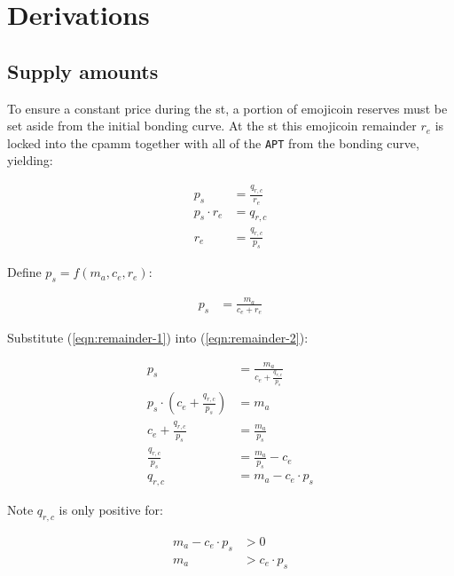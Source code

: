 \documentclass[table, twocolumn]{article}
\begin{document}
\section{Derivations} \label{sec:derivations}

\subsection{Supply amounts} \label{sec:supply-amounts}

To ensure a constant price during the \gls*{st}, a portion of emojicoin reserves must be
set aside from the initial bonding curve. At the \gls*{st} this emojicoin remainder
$r_e$ is locked into the \gls*{cpamm} together with all of the \texttt{APT} from the
bonding curve, yielding:

\begin{align} \label{eqn:remainder-1}
  p_s           & = \frac{q_{r, c}}{r_e} \nonumber \\
  p_s \cdot r_e & = q_{r, c} \nonumber             \\
  r_e           & = \frac{q_{r, c}}{p_s}
\end{align}

Define $p_s = f(m_a, c_e, r_e)$:

\begin{align} \label{eqn:remainder-2}
  p_s & = \frac{m_a}{c_e + r_e}
\end{align}

Substitute (\ref{eqn:remainder-1}) into (\ref{eqn:remainder-2}):

\begin{align} \label{eqn:remainder-3}
  p_s                                                & =
  \frac{m_a}{c_e + \frac{q_{r, c}}{p_s}} \nonumber                                 \\
  p_s \cdot \left(c_e + \frac{q_{r, c}}{p_s} \right) & = m_a \nonumber             \\
  c_e + \frac{q_{r, c}}{p_s}                         & = \frac{m_a}{p_s} \nonumber \\
  \frac{q_{r, c}}{p_s}                               & =
  \frac{m_a}{p_s} - c_e \nonumber                                                  \\
  q_{r, c}                                           & = m_a - c_e \cdot p_s
\end{align}

Note $q_{r, c}$ is only positive for:

\begin{align} \label{eqn:remainder-4}
  m_a - c_e \cdot p_s & > 0 \nonumber   \\
  m_a                 & > c_e \cdot p_s
\end{align}
\end{document}

